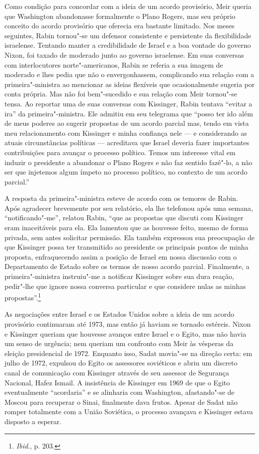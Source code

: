 Como condição para concordar com a ideia de um acordo provisório, Meir
queria que Washington abandonasse formalmente o Plano Rogers, mas seu
próprio conceito do acordo provisório que oferecia era bastante
limitado. Nos meses seguintes, Rabin tornou"-se um defensor consistente e
persistente da flexibilidade israelense. Tentando manter a credibilidade
de Israel e a boa vontade do governo Nixon, foi taxado de moderado
junto ao governo israelense. Em suas conversas com interlocutores
norte"-americanos, Rabin se referia a sua imagem de moderado e lhes pedia
que não o envergonhassem, complicando sua relação com a primeira"-ministra
ao mencionar as ideias flexíveis que ocasionalmente sugeria
por conta própria. Mas não foi bem"-sucedido e sua relação com Meir
tornou"-se tensa. Ao reportar uma de suas conversas com Kissinger, Rabin
tentava ``evitar a ira'' da primeira"-ministra. Ele admitiu em seu
telegrama que ``posso ter ido além de meus poderes ao sugerir propostas
de um acordo parcial mas, tendo em vista meu relacionamento com
Kissinger e minha confiança nele --- e considerando as atuais
circunstâncias políticas --- acreditava que Israel deveria fazer
importantes contribuições para avançar o processo político. Temos um
interesse vital em induzir o presidente a abandonar o Plano Rogers e não
faz sentido fazê"-lo, a não ser que injetemos algum ímpeto no processo
político, no contexto de um acordo parcial.''

A resposta da primeira"-ministra esteve de acordo com os temores de
Rabin. Após agradecer brevemente por seu relatório, ela lhe telefonou após
uma semana, ``notificando"-me'', relatou Rabin, ``que as propostas que
discuti com Kissinger eram inaceitáveis para ela. Ela lamentou que as
houvesse feito, mesmo de forma privada, sem antes solicitar permissão.
Ela também expressou sua preocupação de que Kissinger possa ter
transmitido ao presidente os principais pontos de minha proposta,
enfraquecendo assim a posição de Israel em nossa discussão com o
Departamento de Estado sobre os termos de nosso acordo parcial.
Finalmente, a primeira"-ministra instruiu"-me a notificar Kissinger sobre
sua dura reação, pedir"-lhe que ignore nossa conversa particular e que
considere nulas as minhas propostas''.\footnote{\textit{Ibid}., p. 203.}

As negociações entre Israel e os Estados Unidos sobre a ideia de um
acordo provisório continuaram até 1973, mas então já haviam se tornado
estéreis. Nixon e Kissinger queriam que houvesse avanços entre Israel e
o Egito, mas não havia um senso de urgência; nem queriam um confronto
com Meir às vésperas da eleição presidencial de 1972. Enquanto isso,
Sadat movia"-se na direção certa: em julho de 1972, expulsou do Egito os
assessores soviéticos e abriu um discreto canal de comunicação com
Kissinger através de seu assessor de Segurança Nacional, Hafez Ismail. A
insistência de Kissinger em 1969 de que o Egito eventualmente
``acordaria'' e se alinharia com Washington, afastando"-se de Moscou para
recuperar o Sinai, finalmente dava frutos. Apesar de Sadat não romper
totalmente com a União Soviética, o processo avançava e Kissinger estava
disposto a esperar.

